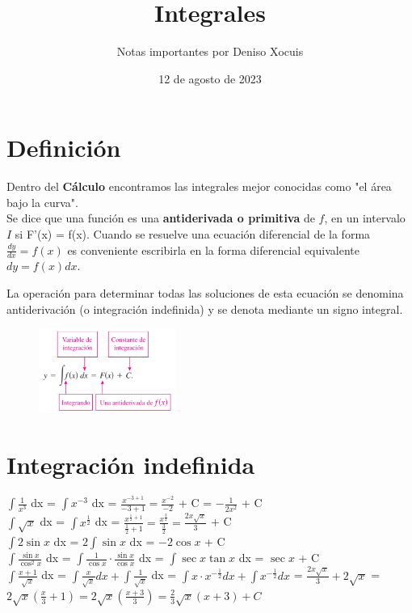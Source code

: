 \documentclass[letterpaper,12pt]{article}
\title {\textbf{Integrales}}
\author{Notas importantes por Deniso Xocuis}
\date{12 de agosto de 2023}
\begin{document}
\maketitle
\newpage
\begin{sloppypar} 

\section{Definición}
Dentro del \textbf{Cálculo} encontramos las integrales mejor conocidas como "el área bajo la curva".
\vspace{0.3cm}\\
Se dice que una función es una \textbf{antiderivada o primitiva} de $f$, en un intervalo $I$ si F'(x) = f(x). Cuando se resuelve una ecuación diferencial de la forma $\frac{dy}{dx} = f(x)$ es conveniente escribirla en la forma diferencial equivalente $dy = f(x) dx$.

La operación para determinar todas las soluciones de esta ecuación se denomina antiderivación (o integración indefinida) y se denota mediante un signo integral. 
\begin{figure}[H]
    \centering
    \includegraphics[width=0.4\textwidth]{intdef.png}
\end{figure}

\section{Integración indefinida}
$\displaystyle \int \frac{1}{x^3}$ dx = $\int x^{-3}$ dx = $\displaystyle \frac{x^{-3+1}}{-3+1} = \frac{x^{-2}}{-2}$ + C = $\displaystyle - \frac{1}{2x^{2}}$ + C 
\vspace{0.3cm}\\ 
$\int \sqrt{x}$ dx = $\int x^{\frac{1}{2}}$ dx = $ \displaystyle \frac{x^{\frac{1}{2} + 1}}{\frac{1}{2} + 1} = \frac{x^{\frac{3}{2}}}{\frac{3}{2}} = \frac{2x \sqrt{x}}{3}$ + C 
\vspace{0.3cm}\\
$\int 2 \sin{x}$ dx = $ 2 \int \sin{x} $ dx = $ -2 \cos{x}$ + C 
\vspace{0.3cm}\\ 
$\displaystyle \int \frac{\sin{x}}{\cos^{2}{x}}$ dx = $\displaystyle \int \frac{1}{\cos{x}} \cdot \frac{\sin{x}}{\cos{x}}$ dx = $\int \sec{x}\tan{x}$ dx = $\sec {x} $ + C
\vspace{0.3cm}\\ 
$\displaystyle \int \frac{x+1}{\sqrt{x}} $ dx = $\displaystyle \int \frac{x}{\sqrt{x}} dx + \int \frac{1}{\sqrt{x}}$ dx = $\int x \cdot x^{- \frac{1}{2}} dx + \int x^{-\frac{1}{2}} dx$ = $\displaystyle \frac{2x\sqrt{x}}{3} + 2\sqrt{x} $ = $\displaystyle 2\sqrt{x} \left(\frac{x}{3} + 1\right) = 2\sqrt{x} \left(\frac{x + 3}{3}\right) = \frac{2}{3} \sqrt{x} \left(x+3\right) + C$


\end{sloppypar}
\end{document}
